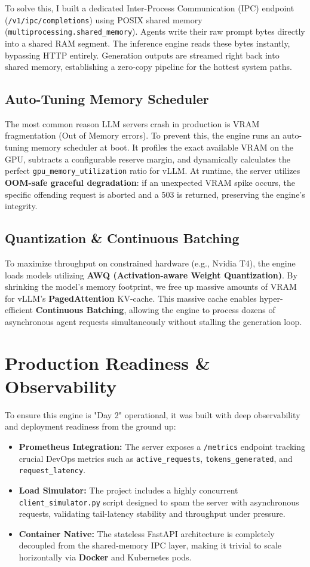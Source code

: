 \documentclass[11pt, letterpaper]{article}
\begin{document}
To solve this, I built a dedicated Inter-Process Communication (IPC) endpoint (\texttt{/v1/ipc/completions}) using POSIX shared memory (\texttt{multiprocessing.shared\_memory}). Agents write their raw prompt bytes directly into a shared RAM segment. The inference engine reads these bytes instantly, bypassing HTTP entirely. Generation outputs are streamed right back into shared memory, establishing a zero-copy pipeline for the hottest system paths.

\subsection{Auto-Tuning Memory Scheduler}
The most common reason LLM servers crash in production is VRAM fragmentation (Out of Memory errors). To prevent this, the engine runs an auto-tuning memory scheduler at boot. 
It profiles the exact available VRAM on the GPU, subtracts a configurable reserve margin, and dynamically calculates the perfect \texttt{gpu\_memory\_utilization} ratio for vLLM. At runtime, the server utilizes \textbf{OOM-safe graceful degradation}: if an unexpected VRAM spike occurs, the specific offending request is aborted and a 503 is returned, preserving the engine's integrity.

\subsection{Quantization \& Continuous Batching}
To maximize throughput on constrained hardware (e.g., Nvidia T4), the engine loads models utilizing \textbf{AWQ (Activation-aware Weight Quantization)}. By shrinking the model's memory footprint, we free up massive amounts of VRAM for vLLM's \textbf{PagedAttention} KV-cache. This massive cache enables hyper-efficient \textbf{Continuous Batching}, allowing the engine to process dozens of asynchronous agent requests simultaneously without stalling the generation loop.

\section{Production Readiness \& Observability}
To ensure this engine is "Day 2" operational, it was built with deep observability and deployment readiness from the ground up:
\begin{itemize}
    \item \textbf{Prometheus Integration:} The server exposes a \texttt{/metrics} endpoint tracking crucial DevOps metrics such as \texttt{active\_requests}, \texttt{tokens\_generated}, and \texttt{request\_latency}.
    \item \textbf{Load Simulator:} The project includes a highly concurrent \texttt{client\_simulator.py} script designed to spam the server with asynchronous requests, validating tail-latency stability and throughput under pressure.
    \item \textbf{Container Native:} The stateless FastAPI architecture is completely decoupled from the shared-memory IPC layer, making it trivial to scale horizontally via \textbf{Docker} and Kubernetes pods.
\end{itemize}
\end{document}
